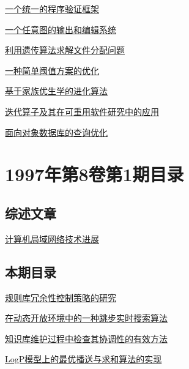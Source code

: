 \documentclass[a4paper]{article}
\begin{document}
\href{http://www.jos.org.cn/ch/reader/download_pdf.aspx?file_no=19970205&year_id=1997&quarter_id=2&falg=1}{一个统一的程序验证框架}

\href{http://www.jos.org.cn/ch/reader/download_pdf.aspx?file_no=19970206&year_id=1997&quarter_id=2&falg=1}{一个任意图的输出和编辑系统}

\href{http://www.jos.org.cn/ch/reader/download_pdf.aspx?file_no=19970207&year_id=1997&quarter_id=2&falg=1}{利用遗传算法求解文件分配问题}

\href{http://www.jos.org.cn/ch/reader/download_pdf.aspx?file_no=19970208&year_id=1997&quarter_id=2&falg=1}{一种简单阈值方案的优化}

\href{http://www.jos.org.cn/ch/reader/download_pdf.aspx?file_no=19970209&year_id=1997&quarter_id=2&falg=1}{基于家族优生学的进化算法}

\href{http://www.jos.org.cn/ch/reader/download_pdf.aspx?file_no=19970210&year_id=1997&quarter_id=2&falg=1}{迭代算子及其在可重用软件研究中的应用}

\href{http://www.jos.org.cn/ch/reader/download_pdf.aspx?file_no=19970211&year_id=1997&quarter_id=2&falg=1}{面向对象数据库的查询优化}


\section{\textbf{1997年第8卷第1期目录}}
\subsection{综述文章}
\href{http://www.jos.org.cn/ch/reader/download_pdf.aspx?file_no=19970111&year_id=1997&quarter_id=1&falg=1}{计算机局域网络技术进展}

\subsection{本期目录}
\href{http://www.jos.org.cn/ch/reader/download_pdf.aspx?file_no=19970101&year_id=1997&quarter_id=1&falg=1}{规则库冗余性控制策略的研究}

\href{http://www.jos.org.cn/ch/reader/download_pdf.aspx?file_no=19970102&year_id=1997&quarter_id=1&falg=1}{在动态开放环境中的一种跳步实时搜索算法}

\href{http://www.jos.org.cn/ch/reader/download_pdf.aspx?file_no=19970103&year_id=1997&quarter_id=1&falg=1}{知识库维护过程中检查其协调性的有效方法}

\href{http://www.jos.org.cn/ch/reader/download_pdf.aspx?file_no=19970104&year_id=1997&quarter_id=1&falg=1}{LogP模型上的最优播送与求和算法的实现}
\end{document}
